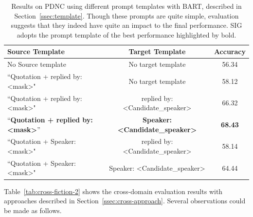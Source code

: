 \documentclass[letterpaper]{article} %
\begin{document}
\begin{table}[thbp!]
    \centering
    \begin{tabular}{l |c|c}

\toprule
       \textbf{Source Template} & \textbf{Target Template } & \textbf{Accuracy}\\
       \midrule

       No Source template &No target template  & 56.34\\
       ``Quotation + replied by: \textless mask\textgreater" &No target template  & 58.12\\
       ``Quotation + replied by: \textless mask\textgreater" &  replied by:
   \textless Candidate\_speaker\textgreater  &66.32 \\
       ``\textbf{Quotation + replied by: \textless mask\textgreater}'' &\textbf{Speaker: \textless Candidate\_speaker\textgreater}  & \textbf{68.43}\\
       ``Quotation + Speaker: \textless mask\textgreater" & replied by: \textless Candidate\_speaker\textgreater  & 58.14\\
       ``Quotation + Speaker: \textless mask\textgreater" &Speaker: \textless Candidate\_speaker\textgreater & 64.44\\
       \bottomrule

    \end{tabular}
    \caption{Results on PDNC using different prompt templates with BART, described in Section~\ref{ssec:template}. Though these prompts are quite simple, evaluation suggests that they indeed have quite an impact to the final performance. SIG adopts the prompt template of the best performance highlighted by bold.}
    \label{tab:template}

\end{table}


Table~\ref{tab:cross-fiction-2} shows the cross-domain evaluation results with approaches described in Section~\ref{ssec:cross-approach}.
Several observations could be made as follows.
\end{document}
